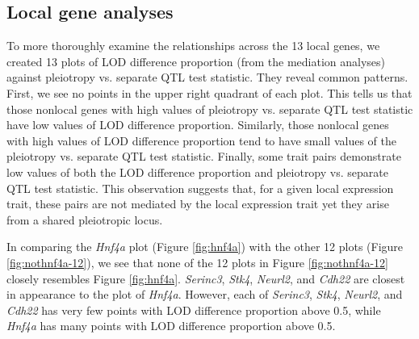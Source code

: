 \documentclass{article}
\begin{document}
\subsection{Local gene analyses}

To more thoroughly examine the relationships across the 13 local genes, we created 13 plots of LOD difference proportion (from the mediation analyses) against pleiotropy vs. separate QTL test statistic. They reveal common patterns. First, we see no points in the upper right quadrant of each plot. This tells us that those nonlocal genes with high values of pleiotropy vs. separate QTL test statistic have low values of LOD difference proportion. Similarly, those nonlocal genes with high values of LOD difference proportion tend to have small values of the pleiotropy vs. separate QTL test statistic. Finally, some trait pairs demonstrate low values of both the LOD difference proportion and pleiotropy vs. separate QTL test statistic. This observation suggests that, for a given local expression trait, these pairs are not mediated by the local expression trait yet they arise from a shared pleiotropic locus. 

In comparing the \emph{Hnf4a} plot (Figure \ref{fig:hnf4a}) with the other 12 plots (Figure \ref{fig:nothnf4a-12}), we see that none of the 12 plots in Figure \ref{fig:nothnf4a-12} closely resembles Figure \ref{fig:hnf4a}. \emph{Serinc3}, \emph{Stk4}, \emph{Neurl2}, and \emph{Cdh22} are closest in appearance to the plot of \emph{Hnf4a}. However, each of \emph{Serinc3}, \emph{Stk4}, \emph{Neurl2}, and \emph{Cdh22} has very few points with LOD difference proportion above 0.5, while \emph{Hnf4a} has many points with LOD difference proportion above 0.5.
\end{document}
